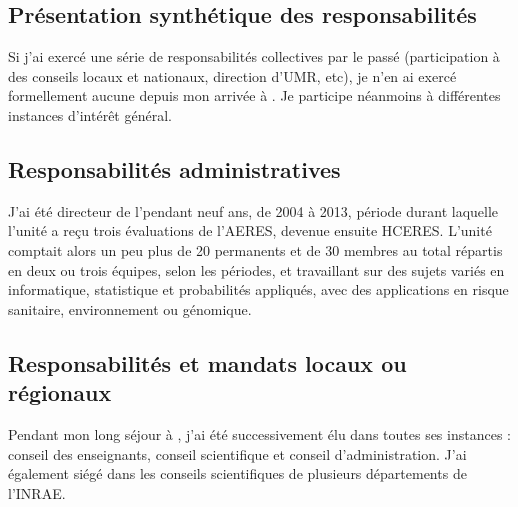 \subsection{Présentation synthétique des responsabilités}

Si j'ai exercé une série de responsabilités collectives par le passé (participation à des conseils locaux et nationaux, direction d’UMR, etc), je n’en ai exercé formellement aucune depuis mon arrivée à \SU. Je participe néanmoins à différentes instances d’intérêt général.

\subsection{Responsabilités administratives}
J’ai été directeur de l’\UMRlong pendant neuf ans, de 2004 à 2013, période durant laquelle l’unité a reçu trois évaluations de l’AERES, devenue ensuite HCERES. L’unité comptait alors un peu plus de 20 permanents et de 30 membres au total répartis en deux ou trois équipes, selon les périodes, et travaillant sur des sujets variés en informatique, statistique et probabilités appliqués, avec des applications en risque sanitaire, environnement ou génomique. 

\subsection{Responsabilités et mandats locaux ou régionaux}
Pendant mon long séjour à \APT, j’ai été successivement élu dans toutes ses instances : conseil des enseignants, conseil scientifique et conseil d’administration. J’ai également siégé dans les conseils scientifiques de plusieurs départements de l’INRAE.

